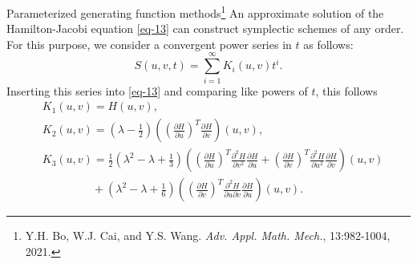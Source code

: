 \documentclass[10pt]{beamer}
\begin{document}
\begin{frame}{Parameterized generating function methods\footnote{Y.H. Bo, W.J. Cai, and Y.S. Wang. {\em Adv. Appl. Math. Mech.}, 13:982-1004, 2021.}}
An approximate solution of the Hamilton-Jacobi equation \eqref{eq-13} can construct symplectic schemes of any order. For this purpose, we consider a convergent power series in $t$ as follows:
\begin{equation}\label{eq-14}
S(u,v,t)=\sum_{i=1}^{\infty} K_i(u,v)t^i.
\end{equation}
Inserting this series into \eqref{eq-13} and comparing like powers of $t$, this follows
\begin{subequations}\label{eq-15}
\begin{align}
&K_1(u,v)=H(u,v),\label{eq-15-a}\\
&K_2(u,v)=(\lambda-\frac{1}{2})\left((\frac{\partial H}{\partial u})^T\frac{\partial H}{\partial v}\right)(u,v),\label{eq-15-b}\\
&K_3(u,v)=\frac{1}{2}(\lambda^2-\lambda+\frac{1}{3})\left((\frac{\partial H}{\partial u})^T \frac{\partial^2H}{\partial v^2}\frac{\partial H}{\partial u}+(\frac{\partial H}{\partial v})^T \frac{\partial^2H}{\partial u^2}\frac{\partial H}{\partial v}\right)(u,v)
\nonumber\\&\quad\quad\quad\quad~~+(\lambda^2-\lambda+\frac{1}{6})\left((\frac{\partial H}{\partial v})^T\frac{\partial^2H}{\partial u\partial v}\frac{\partial H}{\partial u}\right)(u,v).\label{eq-15-c}
\end{align}
\end{subequations}
\end{frame}
\end{document}
